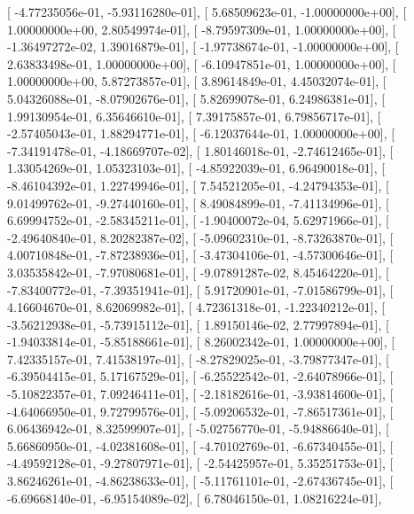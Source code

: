 \documentclass{article}
\begin{document}
       [ -4.77235056e-01,  -5.93116280e-01],
       [  5.68509623e-01,  -1.00000000e+00],
       [  1.00000000e+00,   2.80549974e-01],
       [ -8.79597309e-01,   1.00000000e+00],
       [ -1.36497272e-02,   1.39016879e-01],
       [ -1.97738674e-01,  -1.00000000e+00],
       [  2.63833498e-01,   1.00000000e+00],
       [ -6.10947851e-01,   1.00000000e+00],
       [  1.00000000e+00,   5.87273857e-01],
       [  3.89614849e-01,   4.45032074e-01],
       [  5.04326088e-01,  -8.07902676e-01],
       [  5.82699078e-01,   6.24986381e-01],
       [  1.99130954e-01,   6.35646610e-01],
       [  7.39175857e-01,   6.79856717e-01],
       [ -2.57405043e-01,   1.88294771e-01],
       [ -6.12037644e-01,   1.00000000e+00],
       [ -7.34191478e-01,  -4.18669707e-02],
       [  1.80146018e-01,  -2.74612465e-01],
       [  1.33054269e-01,   1.05323103e-01],
       [ -4.85922039e-01,   6.96490018e-01],
       [ -8.46104392e-01,   1.22749946e-01],
       [  7.54521205e-01,  -4.24794353e-01],
       [  9.01499762e-01,  -9.27440160e-01],
       [  8.49084899e-01,  -7.41134996e-01],
       [  6.69994752e-01,  -2.58345211e-01],
       [ -1.90400072e-04,   5.62971966e-01],
       [ -2.49640840e-01,   8.20282387e-02],
       [ -5.09602310e-01,  -8.73263870e-01],
       [  4.00710848e-01,  -7.87238936e-01],
       [ -3.47304106e-01,  -4.57300646e-01],
       [  3.03535842e-01,  -7.97080681e-01],
       [ -9.07891287e-02,   8.45464220e-01],
       [ -7.83400772e-01,  -7.39351941e-01],
       [  5.91720901e-01,  -7.01586799e-01],
       [  4.16604670e-01,   8.62069982e-01],
       [  4.72361318e-01,  -1.22340212e-01],
       [ -3.56212938e-01,  -5.73915112e-01],
       [  1.89150146e-02,   2.77997894e-01],
       [ -1.94033814e-01,  -5.85188661e-01],
       [  8.26002342e-01,   1.00000000e+00],
       [  7.42335157e-01,   7.41538197e-01],
       [ -8.27829025e-01,  -3.79877347e-01],
       [ -6.39504415e-01,   5.17167529e-01],
       [ -6.25522542e-01,  -2.64078966e-01],
       [ -5.10822357e-01,   7.09246411e-01],
       [ -2.18182616e-01,  -3.93814600e-01],
       [ -4.64066950e-01,   9.72799576e-01],
       [ -5.09206532e-01,  -7.86517361e-01],
       [  6.06436942e-01,   8.32599907e-01],
       [ -5.02756770e-01,  -5.94886640e-01],
       [  5.66860950e-01,  -4.02381608e-01],
       [ -4.70102769e-01,  -6.67340455e-01],
       [ -4.49592128e-01,  -9.27807971e-01],
       [ -2.54425957e-01,   5.35251753e-01],
       [  3.86246261e-01,  -4.86238633e-01],
       [ -5.11761101e-01,  -2.67436745e-01],
       [ -6.69668140e-01,  -6.95154089e-02],
       [  6.78046150e-01,   1.08216224e-01],
\end{document}
